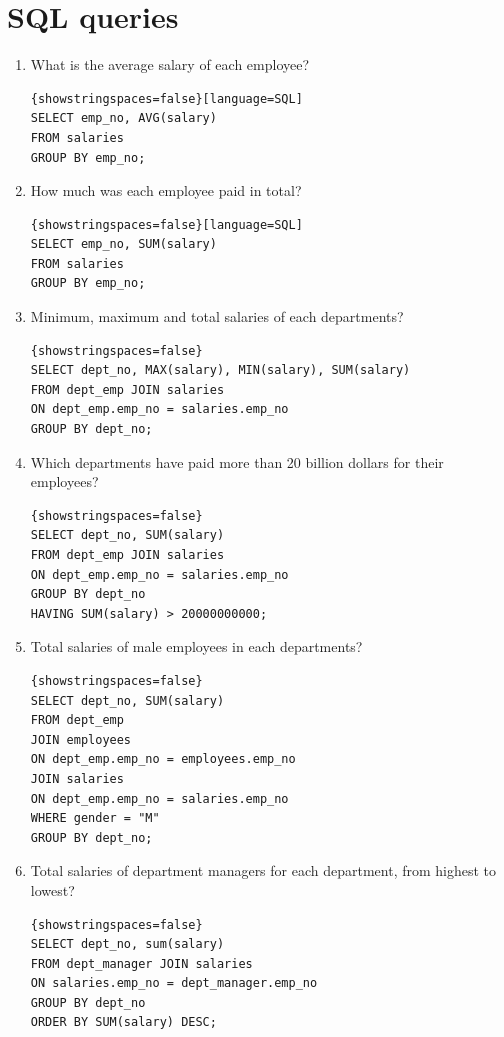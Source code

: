 \documentclass{article}
\begin{document}
\section*{SQL queries}
\begin{enumerate}
	\item What is the average salary of each employee?\\
	\begin{lstlisting}{showstringspaces=false}[language=SQL]
SELECT emp_no, AVG(salary)
FROM salaries
GROUP BY emp_no;
	\end{lstlisting}
	\item How much was each employee paid in total?\\
	
	\begin{lstlisting}{showstringspaces=false}[language=SQL]
SELECT emp_no, SUM(salary)
FROM salaries
GROUP BY emp_no;
	\end{lstlisting}
	
	\item Minimum, maximum and total salaries of each departments?\\
	\begin{lstlisting}{showstringspaces=false}
SELECT dept_no, MAX(salary), MIN(salary), SUM(salary) 
FROM dept_emp JOIN salaries 
ON dept_emp.emp_no = salaries.emp_no
GROUP BY dept_no;
	\end{lstlisting}
	
	
	\item Which departments have paid more than 20 billion dollars for their employees?	
	\begin{lstlisting}{showstringspaces=false}
SELECT dept_no, SUM(salary) 
FROM dept_emp JOIN salaries 
ON dept_emp.emp_no = salaries.emp_no
GROUP BY dept_no
HAVING SUM(salary) > 20000000000;
	\end{lstlisting}
	
	
	\item Total salaries of male employees in each departments?
   \begin{lstlisting}{showstringspaces=false}
SELECT dept_no, SUM(salary) 
FROM dept_emp 
JOIN employees 
ON dept_emp.emp_no = employees.emp_no
JOIN salaries 
ON dept_emp.emp_no = salaries.emp_no
WHERE gender = "M"
GROUP BY dept_no;
	\end{lstlisting}
	
	\item Total salaries of department managers for each department, from highest to lowest?
   \begin{lstlisting}{showstringspaces=false}
SELECT dept_no, sum(salary) 
FROM dept_manager JOIN salaries
ON salaries.emp_no = dept_manager.emp_no
GROUP BY dept_no
ORDER BY SUM(salary) DESC;
	\end{lstlisting}	
	
\end{enumerate}
\end{document}
